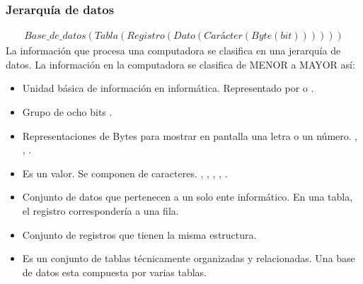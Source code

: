 \documentclass[letterpaper,10pt,spanish]{sphinxmanual}
\begin{document}
\subsubsection{Jerarquía de datos}
\label{\detokenize{1_guias/8logica/G829:jerarquia-de-datos}}\begin{equation*}
\begin{split}
Base\_de\_datos(Tabla(Registro(Dato(Carácter(Byte(bit))))))
\end{split}
\end{equation*}
\sphinxAtStartPar
La información que procesa una computadora se clasifica en una jerarquía de datos. La información en la computadora se clasifica de MENOR a MAYOR así:
\begin{itemize}
\item {} 
\sphinxAtStartPar
{} Unidad básica de información en informática. Representado por  o .

\item {} 
\sphinxAtStartPar
{} Grupo de ocho bits .

\item {} 
\sphinxAtStartPar
{} Representaciones de Bytes para mostrar en pantalla una letra o un número. , , \sphinxcode{\sphinxupquote{\$}}.

\item {} 
\sphinxAtStartPar
{} Es un valor. Se componen de caracteres. , , , , .

\item {} 
\sphinxAtStartPar
{} Conjunto de datos que pertenecen a un solo ente informático. En una tabla, el registro correspondería a una fila.

\item {} 
\sphinxAtStartPar
{} Conjunto de registros que tienen la misma estructura.

\item {} 
\sphinxAtStartPar
{} Es un conjunto de tablas técnicamente organizadas y relacionadas. Una base de datos esta compuesta por varias tablas.

\end{itemize}
\end{document}
